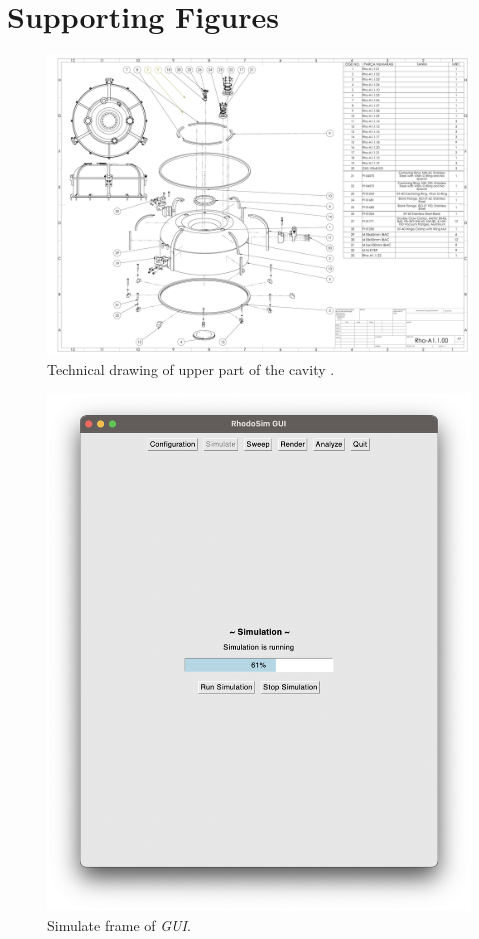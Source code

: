 \documentclass[a4paper,oneside,12pt]{report}
\numberwithin{equation}{chapter}
\begin{document}
\chapter{Supporting Figures} \label{appendix:supp}
\begin{figure}[H]
    \centering
    \includegraphics[angle=270,origin=c, width=.8\linewidth]{./figures/teknikcizim/Rho-A1.1.00.pdf}
    \vspace{20pt}
    \caption{Technical drawing of upper part of the cavity \cite{sinan}.}
    \label{fig:techd_up}
\end{figure}

\begin{figure}
    \centering
    \includegraphics[width=\linewidth]{./figures/rhodoSim/GUI_simulation_frame.png}
    \caption{Simulate frame of \textit{GUI}.}
    \label{fig:gui_simulate_1}
\end{figure}
\end{document}
